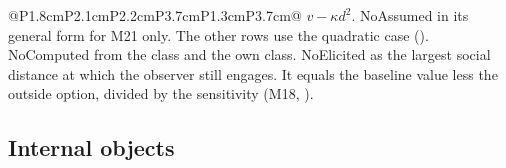 \begin{longtable}{@{}P{1.8cm}P{2.1cm}P{2.2cm}P{3.7cm}P{1.3cm}P{3.7cm}@{}}
{  $v-\kappa d^2$.}
  {No}{Assumed in its general form for M21 only. The other rows use the
  quadratic case ().}
  {No}{Computed from the class and the own class.}
  {No}{Elicited as the largest social distance at which the observer
  still engages. It equals the baseline value less the outside option,
  divided by the sensitivity (M18, ).}
\end{longtable}
\normalsize

\subsection{Internal objects}

